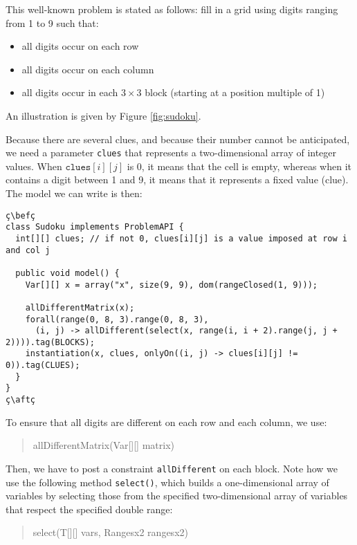 \documentclass[10pt]{article}
\newcommand{\gb}[1]{{\tt #1}} %
\newcommand{\nn}[1]{{\tt #1}} %
\newenvironment{myvb}{\endgraf\small\verbatim}{\endverbatim}
\def\bef{\rule{10cm}{0.1mm}} %
\def\aft{\rule{10cm}{0.1mm}\medskip}
\begin{document}
This well-known problem is stated as follows: fill in a grid using digits ranging from 1 to 9 such that:
\begin{itemize}
\item all digits occur on each row
\item all digits occur on each column
  \item all digits occur in each $3 \times 3$ block (starting at a position multiple of 1) 
\end{itemize}
An illustration is given by Figure \ref{fig:sudoku}.

Because there are several clues, and because their number cannot be anticipated, we need a parameter \texttt{clues} that represents a two-dimensional array of integer values.
When $\texttt{clues}[i][j]$ is 0, it means that the cell is empty, whereas when it contains a digit between 1 and 9, it means that it represents a fixed value (clue).
The model we can write is then:


\begin{lstlisting}
ç\befç
class Sudoku implements ProblemAPI {
  int[][] clues; // if not 0, clues[i][j] is a value imposed at row i and col j

  public void model() {
    Var[][] x = array("x", size(9, 9), dom(rangeClosed(1, 9)));

    allDifferentMatrix(x);
    forall(range(0, 8, 3).range(0, 8, 3),
      (i, j) -> allDifferent(select(x, range(i, i + 2).range(j, j + 2)))).tag(BLOCKS);
    instantiation(x, clues, onlyOn((i, j) -> clues[i][j] != 0)).tag(CLUES);
  }
}
ç\aftç
\end{lstlisting}

To ensure that all digits are different on each row and each column, we use:

\begin{quote}
\begin{myvb}
allDifferentMatrix(Var[][] matrix) 
\end{myvb}
\end{quote}

Then, we have to post a constraint \gb{allDifferent} on each block.
Note how we use the following method \nn{select()}, which builds a one-dimensional array of variables by selecting those from the specified two-dimensional array of variables that respect the specified double range:

\begin{quote}
\begin{myvb}
select(T[][] vars, Rangesx2 rangesx2) 
\end{myvb}
\end{quote}
\end{document}
